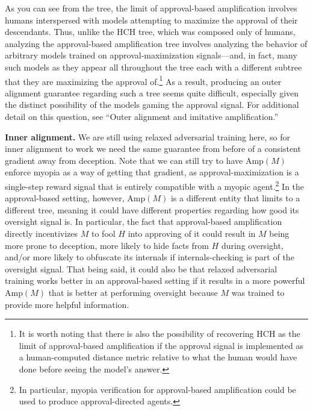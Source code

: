 As you can see from the tree, the limit of approval-based amplification involves humans interspersed with models attempting to maximize the approval of their descendants. Thus, unlike the HCH tree, which was composed only of humans, analyzing the approval-based amplification tree involves analyzing the behavior of arbitrary models trained on approval-maximization signals---and, in fact, many such models as they appear all throughout the tree each with a different subtree that they are maximizing the approval of.\footnote{It is worth noting that there is also the possibility of recovering HCH as the limit of approval-based amplification if the approval signal is implemented as a human-computed distance metric relative to what the human would have done before seeing the model's answer.} As a result, producing an outer alignment guarantee regarding such a tree seems quite difficult, especially given the distinct possibility of the models gaming the approval signal. For additional detail on this question, see ``Outer alignment and imitative amplification\cite{TODO: cite https://www.alignmentforum.org/posts/33EKjmAdKFn3pbKPJ/outer-alignment-and-imitative-amplification}.''

\textbf{Inner alignment.} We are still using relaxed adversarial training here, so for inner alignment to work we need the same guarantee from before of a consistent gradient away from deception. Note that we can still try to have $\text{Amp}(M)$ enforce myopia\cite{TODO: cite https://www.alignmentforum.org/posts/BKM8uQS6QdJPZLqCr/towards-a-mechanistic-understanding-of-corrigibility} as a way of getting that gradient, as approval-maximization is a single-step reward signal that is entirely compatible with a myopic agent.\footnote{In particular, myopia verification for approval-based amplification could be used to produce approval-directed agents\cite{TODO: cite https://ai-alignment.com/model-free-decisions-6e6609f5d9}.} In the approval-based setting, however, $\text{Amp}(M)$ is a different entity that limits to a different tree, meaning it could have different properties regarding how good its oversight signal is. In particular, the fact that approval-based amplification directly incentivizes $M$ to fool $H$ into approving of it could result in $M$ being more prone to deception, more likely to hide facts from $H$ during oversight, and/or more likely to obfuscate its internals if internals-checking is part of the oversight signal. That being said, it could also be that relaxed adversarial training works better in an approval-based setting if it results in a more powerful $\text{Amp}(M)$ that is better at performing oversight because $M$ was trained to provide more helpful information.

